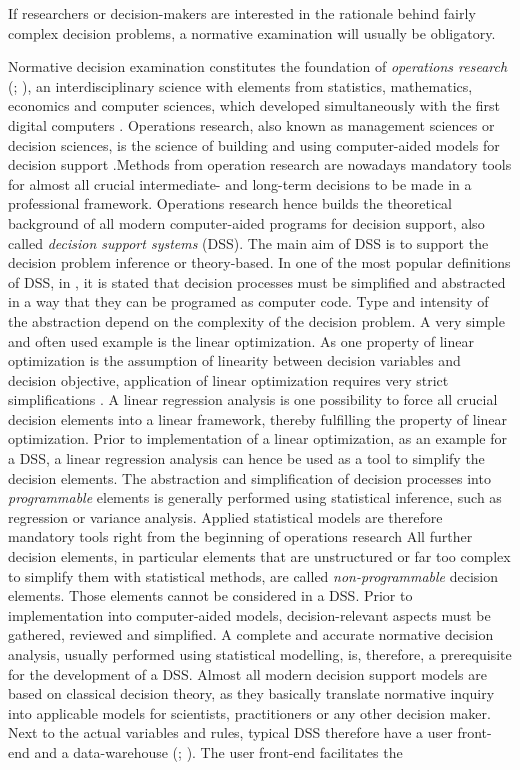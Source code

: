 If researchers or decision-makers are interested in the rationale behind fairly complex decision problems, a normative examination will usually be obligatory.

Normative decision examination constitutes the foundation of \textit{operations research} (\citealp[p. 112]{shim_2002}; \citealp[p. 498]{simon_1979}), an interdisciplinary science with elements from statistics, mathematics, economics and computer sciences, which developed simultaneously with the first digital computers \citep{churchman_1957}. Operations research, also known as management sciences or decision sciences, is the science of building and using computer-aided models for decision support \citep[p. 373-374]{wacker_1998}.Methods from operation research are nowadays mandatory tools for almost all crucial intermediate- and long-term decisions to be made in a professional framework. Operations research hence builds the theoretical background of all modern computer-aided programs for decision support, also called \textit{decision support systems} (DSS). The main aim of DSS is to support the decision problem inference or theory-based. In one of the most popular definitions of DSS, in \citet[p. 26]{gorry_1971}, it is stated that decision processes must be simplified and abstracted in a way that they can be programed as computer code. Type and intensity of the abstraction depend on the complexity of the decision problem. A very simple and often used example is the linear optimization. As one property of linear optimization is the assumption of linearity between decision variables and decision objective, application of linear optimization requires very strict simplifications \citep[p. 129]{kangas_2015}. A linear regression analysis is one possibility to force all crucial decision elements into a linear framework, thereby fulfilling the property of linear optimization. Prior to implementation of a linear optimization, as an example for a DSS, a linear regression analysis can hence be used as a tool to simplify the decision elements. The abstraction and simplification of decision processes into \textit{programmable} elements is generally performed using statistical inference, such as regression or variance analysis. Applied statistical models are therefore mandatory tools right from the beginning of operations research \citep{churchman_1957} All further decision elements, in particular elements that are unstructured or far too complex to simplify them with statistical methods, are called \textit{non-programmable} decision elements. Those elements cannot be considered in a DSS. Prior to implementation into computer-aided models, decision-relevant aspects must be gathered, reviewed and simplified. A complete and accurate normative decision analysis, usually performed using statistical modelling, is, therefore, a prerequisite for the development of a DSS. Almost all modern decision support models are based on classical decision theory, as they basically translate normative inquiry into applicable models for scientists, practitioners or any other decision maker. Next to the actual variables and rules, typical DSS therefore have a user front-end and a data-warehouse (\citealp[p. 2]{hansen_2012}; \citealp[p. 115]{shim_2002}). The user front-end facilitates the 